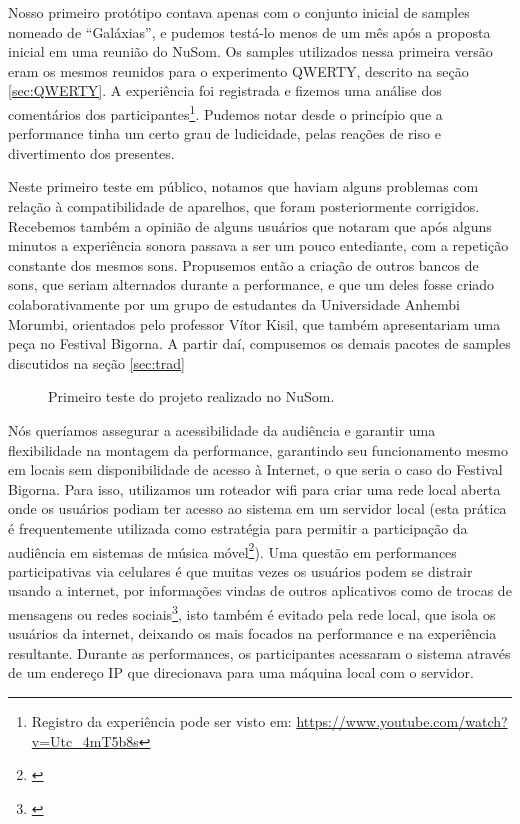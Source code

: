 Nosso primeiro protótipo contava apenas com o conjunto inicial de samples nomeado de ``Galáxias'', e pudemos testá-lo menos de um mês após a proposta inicial em uma reunião do NuSom. Os samples utilizados nessa primeira versão eram os mesmos reunidos para o experimento QWERTY, descrito na seção \ref{sec:QWERTY}. A experiência foi registrada e fizemos uma análise dos comentários dos participantes\footnote{Registro da experiência pode ser visto em: \url{https://www.youtube.com/watch?v=Utc_4mT5b8s}}. Pudemos notar desde o princípio que a performance tinha um certo grau de ludicidade, pelas reações de riso e divertimento dos presentes. 


Neste primeiro teste em público, notamos que haviam alguns problemas com relação à compatibilidade de aparelhos, que foram posteriormente corrigidos. Recebemos também a opinião de alguns usuários que notaram que após alguns minutos a experiência sonora passava a ser um pouco entediante, com a repetição constante dos mesmos sons. Propusemos então a criação de outros bancos de sons, que seriam alternados durante a performance, e que um deles fosse criado colaborativamente por um grupo de estudantes da Universidade Anhembi Morumbi, orientados pelo professor Vítor Kisil,  que também apresentariam uma peça no Festival Bigorna. A partir daí, compusemos os demais pacotes de samples discutidos na seção \ref{sec:trad}



\begin{figure}
   
   \caption{Primeiro teste do projeto realizado no NuSom.}
    \label{fig:testenusom}
 \end{figure}
Nós queríamos assegurar a acessibilidade da audiência e garantir uma flexibilidade na montagem da performance, garantindo seu funcionamento mesmo em locais sem disponibilidade de acesso à Internet, o que seria o caso do Festival Bigorna. Para isso, utilizamos um roteador wifi para criar uma rede local aberta onde os usuários podiam ter acesso ao sistema em um servidor local (esta prática é frequentemente utilizada como estratégia para permitir a participação da audiência em sistemas de música móvel\footnote{\cite{Lambert:2016}}). Uma questão em performances participativas via celulares é que muitas vezes os usuários podem se distrair usando a internet, por informações vindas de outros aplicativos como de trocas de mensagens ou redes sociais\footnote{\cite{wu2017open}}, isto também é evitado pela rede local, que isola os usuários da internet, deixando os mais focados na performance e na experiência resultante. Durante as performances, os participantes acessaram o sistema através de um endereço IP que direcionava para uma máquina local com o servidor.

